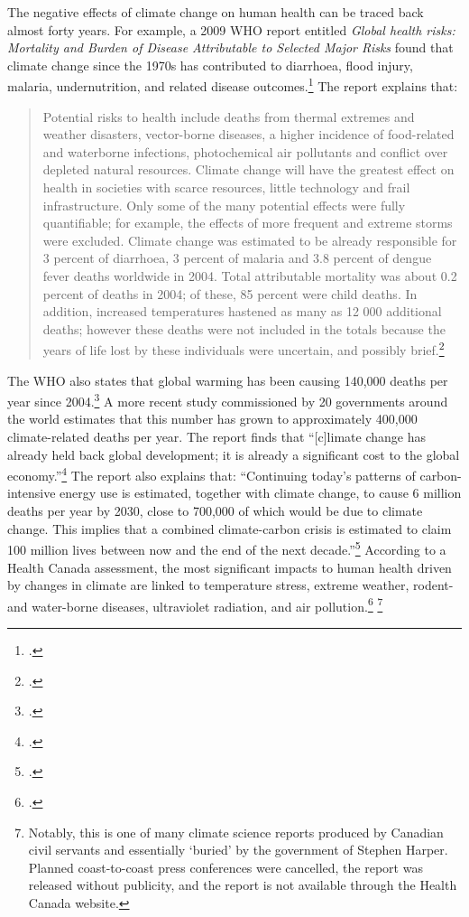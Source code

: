 The negative effects of climate change on human health can be traced back almost forty years. 
For example, a 2009 WHO report entitled \emph{Global health risks: Mortality and Burden of Disease Attributable to Selected Major Risks} found that climate change since the 1970s has contributed to diarrhoea, flood injury, malaria, undernutrition, and related disease outcomes.\footcite[][p. 44]{WHOGlobalHealthRisks}
The report explains that:
\begin{quote}
Potential risks to health include deaths from thermal extremes and weather disasters, vector-borne diseases, a higher incidence of food-related and waterborne infections, photochemical air pollutants and conflict over depleted natural resources. Climate change will have the greatest effect on health in societies with scarce resources, little technology and frail infrastructure. Only some of the many potential effects were fully quantifiable; for example, the effects of more frequent and extreme storms were excluded. Climate change was estimated to be already responsible for 3 percent of diarrhoea, 3 percent of malaria and 3.8 percent of dengue fever deaths worldwide in 2004. Total attributable mortality was about 0.2 percent of deaths in 2004; of these, 85 percent were child deaths. In addition, increased temperatures hastened as many as 12 000 additional deaths; however these deaths were not included in the totals because the years of life lost by these individuals were uncertain, and possibly brief.\footcite[][p. 24]{WHOGlobalHealthRisks}
\end{quote}
The WHO also states that global warming has been causing 140,000 deaths per year since 2004.\footcite[][]{WHOCCandHealth2012}
A more recent study commissioned by 20 governments around the world estimates that this number has grown to approximately 400,000 climate-related deaths per year.
The report finds that ``[c]limate change has already held back global development; it is already a significant cost to the global economy.''\footcite[][p. 16]{DARACVM}
The report also explains that: ``Continuing today's patterns of carbon-intensive energy use is estimated, together with climate 
change, to cause 6 million deaths per year by 2030, close to 700,000 of which would be due to climate change. This implies that a combined climate-carbon crisis is estimated to claim 100 million lives between now and the end of the next decade.''\footcite[][p. 17]{DARACVM}
According to a Health Canada assessment, the most significant impacts to human health driven by changes in climate are linked to temperature stress, extreme weather, rodent- and water-borne diseases, ultraviolet radiation, and air pollution.\footcite[][]{HHInACC} \footnote{Notably, this is one of many climate science reports produced by Canadian civil servants and essentially `buried' by the government of Stephen Harper. Planned coast-to-coast press conferences were cancelled, the report was released without publicity, and the report is not available through the Health Canada website.}
